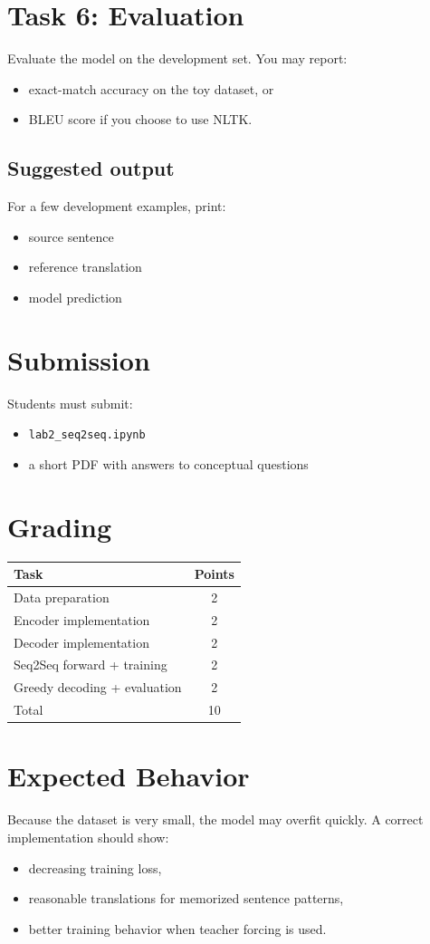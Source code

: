 \documentclass[12pt]{article}
\begin{document}
\section{Task 6: Evaluation}
Evaluate the model on the development set.
You may report:
\begin{itemize}
    \item exact-match accuracy on the toy dataset, or
    \item BLEU score if you choose to use NLTK.
\end{itemize}

\subsection*{Suggested output}
For a few development examples, print:
\begin{itemize}
    \item source sentence
    \item reference translation
    \item model prediction
\end{itemize}

\section{Submission}
Students must submit:
\begin{itemize}
    \item \texttt{lab2_seq2seq.ipynb}
    \item a short PDF with answers to conceptual questions
\end{itemize}

\section{Grading}
\begin{center}
\begin{tabular}{lc}
\toprule
Task & Points \\
\midrule
Data preparation & 2 \\
Encoder implementation & 2 \\
Decoder implementation & 2 \\
Seq2Seq forward + training & 2 \\
Greedy decoding + evaluation & 2 \\
\midrule
Total & 10 \\
\bottomrule
\end{tabular}
\end{center}

\section{Expected Behavior}
Because the dataset is very small, the model may overfit quickly.
A correct implementation should show:
\begin{itemize}
    \item decreasing training loss,
    \item reasonable translations for memorized sentence patterns,
    \item better training behavior when teacher forcing is used.
\end{itemize}
\end{document}
